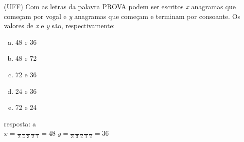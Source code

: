 \begin{ex}
 (UFF) Com as letras da palavra PROVA podem ser escritos \textit{x} anagramas que começam por vogal e \textit{y}   anagramas que começam e terminam por consoante. Os valores de \textit{x} e \textit{y}  são,  respectivamente:
    \begin{enumerate}[(a)]
    \item 48 e 36
    \item 48 e 72
    \item 72 e 36
    \item 24 e 36
    \item 72 e 24
    \end{enumerate}
      \begin{sol}
        resposta: a \\
        $x= \frac{\phantom{A}}{2}\frac{\phantom{A}}{4}\frac{\phantom{A}}{3}\frac{\phantom{A}}{2}\frac{\phantom{A}}{1} = 48$\hspace{1.2cm}
        $y= \frac{\phantom{A}}{3}\frac{\phantom{A}}{3}\frac{\phantom{A}}{2}\frac{\phantom{A}}{1}\frac{\phantom{A}}{2}=36$
        
      \end{sol}
\end{ex}